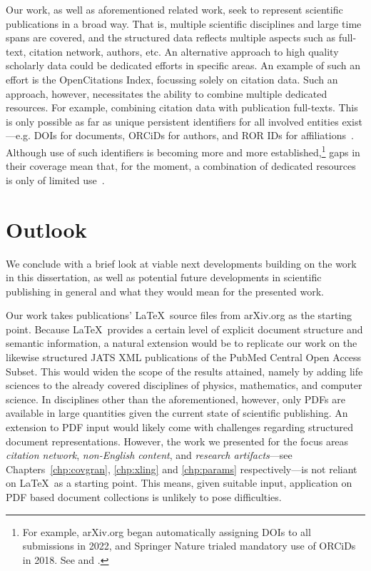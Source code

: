 Our work, as well as aforementioned related work, seek to represent scientific publications in a broad way. That is, multiple scientific disciplines and large time spans are covered, and the structured data reflects multiple aspects such as full-text, citation network, authors, etc. An alternative approach to high quality scholarly data could be dedicated efforts in specific areas. An example of such an effort is the OpenCitations Index, focussing solely on citation data. Such an approach, however, necessitates the ability to combine multiple dedicated resources. For example, combining citation data with publication full-texts. This is only possible as far as unique persistent identifiers for all involved entities exist---e.g. DOIs for documents, ORCiDs for authors, and ROR IDs for affiliations~\cite{Meadows2019}. Although use of such identifiers is becoming more and more established,\footnote{For example, arXiv.org began automatically assigning DOIs to all submissions in 2022, and Springer Nature trialed mandatory use of ORCiDs in 2018. See  and .} gaps in their coverage mean that, for the moment, a combination of dedicated resources is only of limited use~\cite{Youtie2017,Haak2018}.

\section{Outlook}

We conclude with a brief look at viable next developments building on the work in this dissertation, as well as potential future developments in scientific publishing in general and what they would mean for the presented work.

Our work takes publications' \LaTeX\ source files from arXiv.org as the starting point. Because \LaTeX\ provides a certain level of explicit document structure and semantic information, a natural extension would be to replicate our work on the likewise structured JATS XML publications of the PubMed Central Open Access Subset. This would widen the scope of the results attained, namely by adding life sciences to the already covered disciplines of physics, mathematics, and computer science. In disciplines other than the aforementioned, however, only PDFs are available in large quantities given the current state of scientific publishing. An extension to PDF input would likely come with challenges regarding structured document representations. However, the work we presented for the focus areas \emph{citation network}, \emph{non-English content}, and \emph{research artifacts}---see Chapters~\ref{chp:covgran}, \ref{chp:xling} and \ref{chp:params} respectively---is not reliant on \LaTeX\ as a starting point. This means, given suitable input, application on PDF based document collections is unlikely to pose difficulties.


